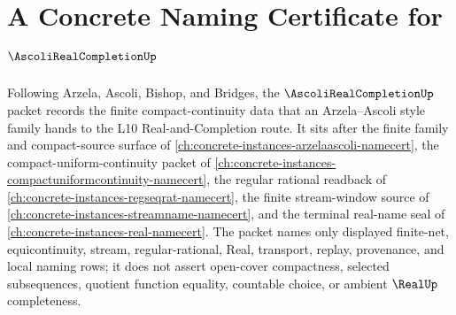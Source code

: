 \chapter{A Concrete Naming Certificate for $\AscoliRealCompletionUp$}
\label{ch:concrete-instances-ascoli-real-completion-namecert}

Following Arzela, Ascoli, Bishop, and Bridges, the $\AscoliRealCompletionUp$ packet records the finite compact-continuity data that an Arzela--Ascoli style family hands to the L10 Real-and-Completion route. It sits after the finite family and compact-source surface of \autoref{ch:concrete-instances-arzelaascoli-namecert}, the compact-uniform-continuity packet of \autoref{ch:concrete-instances-compactuniformcontinuity-namecert}, the regular rational readback of \autoref{ch:concrete-instances-regseqrat-namecert}, the finite stream-window source of \autoref{ch:concrete-instances-streamname-namecert}, and the terminal real-name seal of \autoref{ch:concrete-instances-real-namecert}. The packet names only displayed finite-net, equicontinuity, stream, regular-rational, Real, transport, replay, provenance, and local naming rows; it does not assert open-cover compactness, selected subsequences, quotient function equality, countable choice, or ambient $\RealUp$ completeness.

